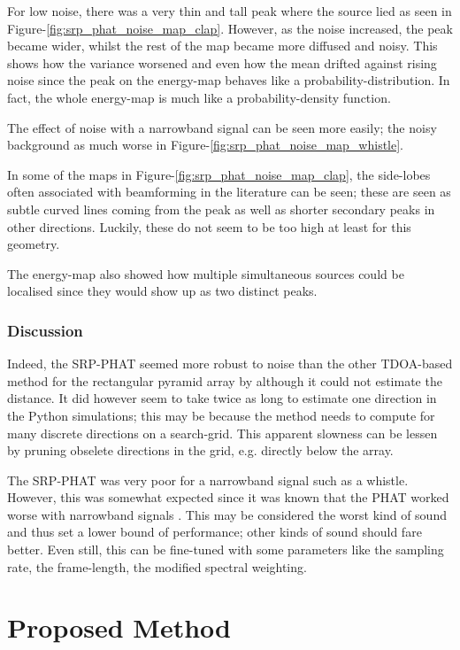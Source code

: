 \documentclass[notitlepage]{report}
\begin{document}
For low noise, there was a very thin and tall peak where the source lied as seen in Figure-\ref{fig:srp_phat_noise_map_clap}. However, as the noise increased, the peak became wider, whilst the rest of the map became more diffused and noisy. This shows how the variance worsened and even how the mean drifted against rising noise since the peak on the energy-map behaves like a probability-distribution. In fact, the whole energy-map is much like a probability-density function.

The effect of noise with a narrowband signal can be seen more easily; the noisy background as much worse in Figure-\ref{fig:srp_phat_noise_map_whistle}.

In some of the maps in Figure-\ref{fig:srp_phat_noise_map_clap}, the side-lobes often associated with beamforming in the literature can be seen; these are seen as subtle curved lines coming from the peak as well as shorter secondary peaks in other directions. Luckily, these do not seem to be too high at least for this geometry.

The energy-map also showed how multiple simultaneous sources could be localised since they would show up as two distinct peaks.

\subsubsection{Discussion}

Indeed, the SRP-PHAT seemed more robust to noise than the other TDOA-based method for the rectangular pyramid array by \cite{chen_sound_2019} although it could not estimate the distance. It did however seem to take twice as long to estimate one direction in the Python simulations; this may be because the method needs to compute for many discrete directions on a search-grid. This apparent slowness can be lessen by pruning obselete directions in the grid, e.g. directly below the array.

The SRP-PHAT was very poor for a narrowband signal such as a whistle. However, this was somewhat expected since it was known that the PHAT worked worse with narrowband signals \cite{valin_localization_2004} \cite{valin_robust_2007}. This may be considered the worst kind of sound and thus set a lower bound of performance; other kinds of sound should fare better. Even still, this can be fine-tuned with some parameters like the sampling rate, the frame-length, the modified spectral weighting. 

\section{Proposed Method}
\end{document}
